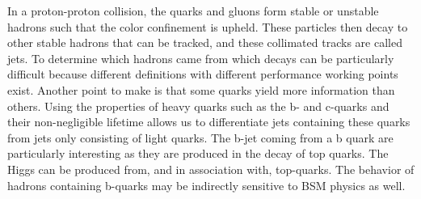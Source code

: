 In a proton-proton collision, the quarks and gluons form stable or unstable hadrons such 
that the color confinement\cite{Hwang_Wu_2018} is upheld. These particles then decay to other stable 
hadrons that can be tracked, and these collimated tracks are called jets. To determine which 
hadrons came from which decays can be particularly difficult because different definitions with 
different performance working points exist. Another point to make is that some quarks yield more 
information than others. Using the properties of heavy quarks such as the b- and c-quarks and 
their non-negligible lifetime allows us to differentiate jets containing these quarks from 
jets only consisting of light quarks. The b-jet coming from a b quark are particularly interesting 
as they are produced in the decay of top quarks. The Higgs can be produced from, 
and in association with, top-quarks. The behavior of hadrons containing b-quarks may be 
indirectly sensitive to BSM physics as well. 
